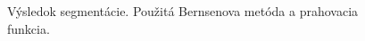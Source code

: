 \documentclass[a4paper,11pt,oneside]{article}%
\begin{document}
\begin{figure}[H]
    \hspace{5px}
    \hspace{5px}
    \caption{Výsledok segmentácie. Použitá Bernsenova metóda a prahovacia funkcia.}
    \label{fig:bernsen_tf}
\end{figure}
\end{document}
